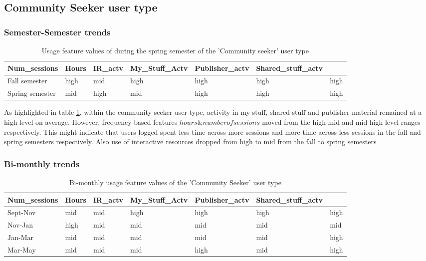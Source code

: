 \documentclass{acm_proc_article-sp}
\begin{document}
\subsection{Community Seeker user type}

\subsubsection{Semester-Semester trends}

\begin{table}
\caption{Usage feature values of during the spring semester of the 'Community seeker' user type}
\label{cluster2month}
\begin{tabular}{|p{1cm}|p{1cm}|p{1cm}|p{1cm}|p{1cm}|p{1cm}|p{1cm}|}
 Num\_sessions & Hours & IR\_actv & My\_Stuff\_Actv & Publisher\_actv & Shared\_stuff\_actv \\ \hline
Fall  semester & high & mid  & high & high & high & high \\ \hline
Spring semester & mid & high  & mid & high & high & high \\ \hline
\end{tabular}
\end{table}

As highlighted in table \ref{cluster2month}, within the community seeker user type, activity in my stuff, shared stuff and publisher material remained at a high level on average. However, frequency based features \(hours \& number of sessions\) moved from the high-mid and mid-high level ranges respectively. This might indicate that users logged spent less time across more sessions and more time across less sessions in the fall and spring semesters respectively. Also use of interactive resources dropped from high to mid from the fall to spring semesters

\subsubsection{Bi-monthly trends}
\begin{table}
\caption{Bi-monthly usage feature values of the 'Community Seeker' user type}
\label{cluster1bimonthly}
\begin{tabular}{|p{}|p{1cm}|p{1cm}|p{1cm}|p{1cm}|p{1cm}|p{1cm}|}
 Num\_sessions & Hours & IR\_actv & My\_Stuff\_Actv & Publisher\_actv & Shared\_stuff\_actv \\ \hline
Sept-Nov & mid & mid  & high & high & high & high \\ \hline
Nov-Jan & high & mid  & mid & mid & mid & mid \\ \hline
Jan-Mar & mid & mid  & mid & mid & mid & high \\ \hline
Mar-May & mid & mid  & mid & high & mid & high \\ \hline
\end{tabular}
\end{table}
\end{document}
